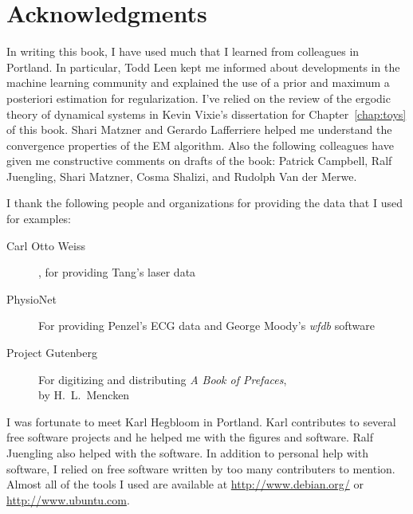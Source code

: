 \documentclass[dvips]{hmmdsbook}
\begin{document}
\section*{Acknowledgments}
%
\label{sec:ack}
\longpage%

In writing this book, I have used much that I learned from
colleagues in Portland.  In particular, Todd Leen kept me informed
about developments in the machine learning community and explained the
use of a prior and maximum a posteriori estimation for regularization.
I've relied on the review of the ergodic theory of dynamical systems
in Kevin Vixie's dissertation\cite{vixie02} for
Chapter~\ref{chap:toys} of this book.  Shari Matzner and Gerardo
Lafferriere helped me understand the convergence properties of the EM
algorithm.  Also the following colleagues have given me constructive
comments on drafts of the book:
% 
Patrick Campbell, %
Ralf Juengling, %
Shari Matzner, %
Cosma Shalizi, %
and %
Rudolph Van der Merwe. %

I thank the following people and organizations for providing the data
that I used for examples:
\begin{description}
\item[Carl Otto Weiss], for providing Tang's\cite{Tang92} laser data
\item[PhysioNet] For providing Penzel's\cite{Penzel02} ECG data and
  George Moody's \emph{wfdb} software \cite{PhysioToolkit}
\item[Project Gutenberg] For digitizing and distributing \emph{A
    Book of Prefaces},\\ by H.~L.~Mencken
\end{description}

I was fortunate to meet Karl Hegbloom in Portland.  Karl contributes
to several free software projects and he helped me with the figures
and software.  Ralf Juengling also helped with the software.  In
addition to personal help with software, I relied on free software
written by too many contributers to mention.  Almost all of the tools
I used are available at \url{http://www.debian.org/} or
\url{http://www.ubuntu.com}.
\end{document}
